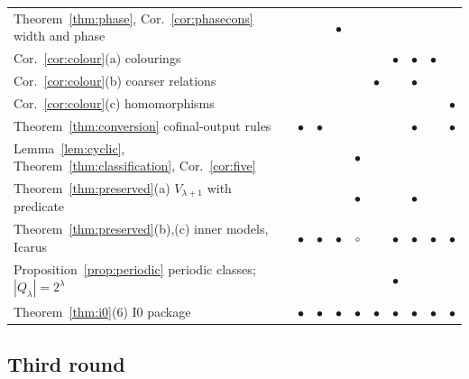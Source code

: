 \documentclass[11pt,letterpaper]{article}
\theoremstyle{definition}
\numberwithin{equation}{section}
\newcommand{\Izero}{\mathrm{I0}}
\newcommand{\yes}{$\bullet$}
\newcommand{\prt}{$\circ$}
\begin{document}
\begin{longtable}{@{}P{.47\textwidth}CCCCCCCCC@{}}
Theorem~\ref{thm:phase}, Cor.~\ref{cor:phasecons} width and phase&&&\yes&&&&&&\\
Cor.~\ref{cor:colour}(a) colourings&&&&&&\yes&\yes&\yes&\\
Cor.~\ref{cor:colour}(b) coarser relations&&&&&\yes&&\yes&&\\
Cor.~\ref{cor:colour}(c) homomorphisms&&&&&&&&&\yes\\
Theorem~\ref{thm:conversion} cofinal-output rules&\yes&\yes&&&&&\yes&&\yes\\
Lemma~\ref{lem:cyclic}, Theorem~\ref{thm:classification}, Cor.~\ref{cor:five}&&&&\yes&&&&&\\
Theorem~\ref{thm:preserved}(a) $V_{\lambda+1}$ with predicate&&&&\yes&&&\yes&&\\
Theorem~\ref{thm:preserved}(b),(c) inner models, Icarus&\yes&\yes&\yes&\prt&&\yes&\yes&\yes&\yes\\
Proposition~\ref{prop:periodic} periodic classes; $|Q_\lambda|=2^\lambda$&&&&&&\yes&&&\\
Theorem~\ref{thm:i0}(6) $\Izero$ package&\yes&\yes&\yes&\yes&\yes&\yes&\yes&\yes&\yes\\
\bottomrule
\end{longtable}
\endgroup

\subsection*{Third round}
\end{document}
